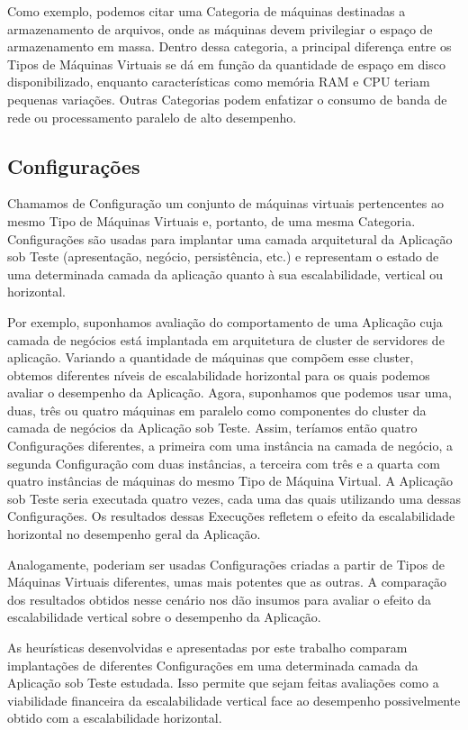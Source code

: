 Como exemplo, podemos citar uma Categoria de máquinas destinadas a armazenamento 
de arquivos, onde as máquinas devem privilegiar o espaço de armazenamento em 
massa. Dentro dessa categoria, a principal diferença entre os Tipos de Máquinas 
Virtuais se dá em função da quantidade de espaço em disco disponibilizado, 
enquanto características como memória RAM e CPU teriam pequenas variações. 
Outras Categorias podem enfatizar o consumo de banda de rede ou processamento 
paralelo de alto desempenho.

\subsection{Configurações}
Chamamos de Configuração um conjunto de máquinas virtuais pertencentes ao mesmo 
Tipo de Máquinas Virtuais e, portanto, de uma mesma Categoria. Configurações são
usadas para implantar uma camada arquitetural da Aplicação sob Teste (apresentação, 
negócio, persistência, etc.) e representam o estado de uma determinada camada da 
aplicação quanto à sua escalabilidade, vertical ou horizontal.

Por exemplo, suponhamos avaliação do comportamento de uma Aplicação cuja camada de
negócios está implantada em arquitetura de cluster de servidores de aplicação. 
Variando a quantidade de máquinas que compõem esse cluster, obtemos diferentes níveis
de escalabilidade horizontal para os quais podemos avaliar o desempenho da Aplicação.
Agora, suponhamos que podemos usar uma, duas, três ou quatro máquinas em paralelo como
componentes do cluster da camada de negócios da Aplicação sob Teste. Assim, teríamos
então quatro Configurações diferentes, a primeira com uma instância na camada de negócio,
a segunda Configuração com duas instâncias, a terceira com três e a quarta com quatro 
instâncias de máquinas do mesmo Tipo de Máquina Virtual. A Aplicação sob Teste seria 
executada quatro vezes, cada uma das quais utilizando uma dessas Configurações. Os 
resultados dessas Execuções refletem o efeito da escalabilidade horizontal no desempenho
geral da Aplicação.

Analogamente, poderiam ser usadas Configurações criadas a partir de Tipos de Máquinas
Virtuais diferentes, umas mais potentes que as outras. A comparação dos resultados obtidos
nesse cenário nos dão insumos para avaliar o efeito da escalabilidade vertical sobre o
desempenho da Aplicação.

As heurísticas desenvolvidas e apresentadas por este trabalho comparam 
implantações de diferentes Configurações em uma determinada camada da Aplicação 
sob Teste estudada. Isso permite que sejam feitas avaliações como a viabilidade 
financeira da escalabilidade vertical face ao desempenho possivelmente obtido 
com a escalabilidade horizontal.

